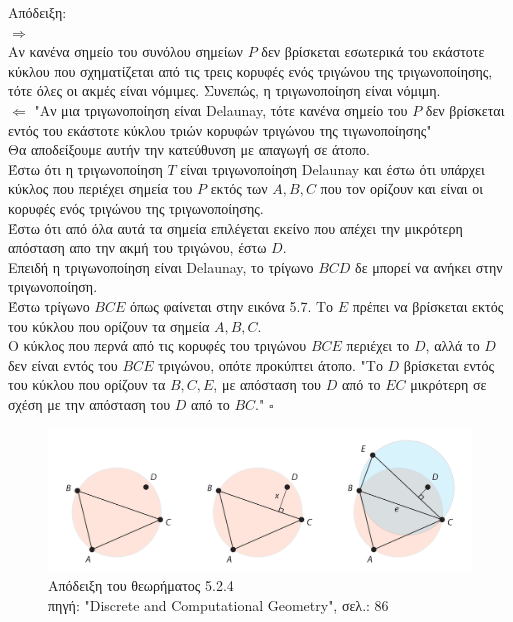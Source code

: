 \documentclass[oneside,12pt]{book}
\newenvironment{matlab}
	{\begin{figure}[hp]\centering\captionsetup{justification=centering}}
	{\end{figure}}
\theoremstyle{definition}
\begin{document}
Απόδειξη: \\
\(\Rightarrow \) \\
Αν κανένα σημείο του συνόλου σημείων \(P\) δεν βρίσκεται εσωτερικά του εκάστοτε κύκλου που σχηματίζεται από τις τρεις κορυφές ενός τριγώνου της τριγωνοποίησης, τότε όλες οι ακμές είναι νόμιμες. Συνεπώς, η τριγωνοποίηση είναι νόμιμη. \\
\(\Leftarrow \) "Αν μια τριγωνοποίηση είναι Delaunay, τότε κανένα σημείο του \(P\) δεν βρίσκεται εντός του εκάστοτε κύκλου τριών κορυφών τριγώνου της τιγωνοποίησης" \\
Θα αποδείξουμε αυτήν την κατεύθυνση με απαγωγή σε άτοπο. \\
Έστω ότι η τριγωνοποίηση \(T\) είναι τριγωνοποίηση Delaunay και έστω ότι υπάρχει κύκλος που περιέχει σημεία του \(P\) εκτός των \(A, B, C\) που τον ορίζουν και είναι οι κορυφές ενός τριγώνου της τριγωνοποίησης. \\
Έστω ότι από όλα αυτά τα σημεία επιλέγεται εκείνο που απέχει την μικρότερη απόσταση απο την ακμή του τριγώνου, έστω \(D\). \\
Επειδή η τριγωνοποίηση είναι Delaunay, το τρίγωνο \(BCD\) δε μπορεί να ανήκει στην τριγωνοποίηση. \\
Έστω τρίγωνο \(BCE\) όπως φαίνεται στην εικόνα 5.7. Το \(E\) πρέπει να βρίσκεται εκτός του κύκλου που ορίζουν τα σημεία \(A, B, C\). \\
Ο κύκλος που περνά από τις κορυφές του τριγώνου \(BCE\) περιέχει το \(D\), αλλά το \(D\) δεν είναι εντός του \(BCE\) τριγώνου, οπότε προκύπτει άτοπο. "Το \(D\) βρίσκεται εντός του κύκλου που ορίζουν τα \(B,C,E\), με απόσταση του \(D\) από το \(EC\) μικρότερη σε σχέση με την απόσταση του \(D\) από το \(BC\)." \(\square\) \\

\begin{matlab}
	\includegraphics[scale=0.3]{images/emptycircle.png}
	\caption{Απόδειξη του θεωρήματος 5.2.4 \\ πηγή: "Discrete and Computational Geometry", σελ.: 86}
\end{matlab} 
\end{document}
